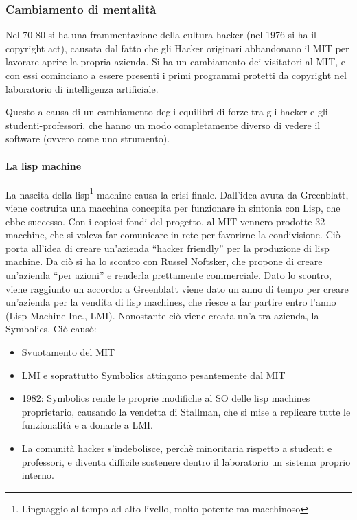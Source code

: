 \subsubsection{Cambiamento di mentalit\`a}

Nel 70-80 si ha una frammentazione della cultura hacker (nel 1976 si ha il copyright act), causata dal fatto che gli Hacker originari abbandonano il MIT per lavorare-aprire la propria azienda. Si ha un cambiamento dei visitatori al MIT, e con essi cominciano a essere presenti i primi programmi protetti da copyright nel laboratorio di intelligenza artificiale.

Questo a causa di un cambiamento degli equilibri di forze tra gli hacker e gli studenti-professori, che hanno un modo completamente diverso di vedere il software (ovvero come uno strumento).

\paragraph*{La lisp machine} La nascita della lisp\footnote{Linguaggio al tempo ad alto livello, molto potente ma macchinoso} machine causa la crisi finale. Dall'idea avuta da Greenblatt, viene costruita una macchina concepita per funzionare in sintonia con Lisp, che ebbe successo. Con i copiosi fondi del progetto, al MIT vennero prodotte 32 macchine, che si voleva far comunicare in rete per favorirne la condivisione. Ci\`o porta all'idea di creare un'azienda ``hacker friendly'' per la produzione di lisp machine. Da ci\`o si ha lo scontro con Russel Noftsker, che propone di creare un'azienda ``per azioni'' e renderla prettamente commerciale. Dato lo scontro, viene raggiunto un accordo: a Greenblatt viene dato un anno di tempo per creare un'azienda per la vendita di lisp machines, che riesce a far partire entro l'anno (Lisp Machine Inc., LMI). Nonostante ci\`o viene creata un'altra azienda, la Symbolics. Ci\`o caus\`o:
\begin{itemize}

\item Svuotamento del MIT
\item LMI e soprattutto Symbolics attingono pesantemente dal MIT
\item 1982: Symbolics rende le proprie modifiche al SO delle lisp machines proprietario, causando la vendetta di Stallman, che si mise a replicare tutte le funzionalit\`a e a donarle a LMI.
\item La comunit\`a hacker s'indebolisce, perch\`e minoritaria rispetto a studenti e professori, e diventa difficile sostenere dentro il laboratorio un sistema proprio interno.

\end{itemize}

